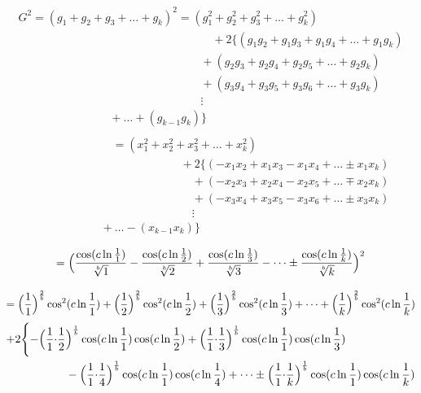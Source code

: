 \documentclass{amsart}
\begin{document}
	\[ \begin{array}{c}
		G^2 = (g_1 + g_2 + g_3 + \dots + g_k)^2 = (g_1^2 + g_2^2 + g_3^2 + \dots + g_k^2) \\
		\qquad\qquad\qquad\qquad\qquad\qquad\qquad\qquad\quad + 2\{(g_1g_2 + g_1g_3 + g_1g_4 + \dots + g_{1}g_{k}) \\ 
		\qquad\qquad\qquad\qquad\qquad\qquad\qquad\qquad + (g_2g_3 + g_2g_4 + g_2g_5 + \dots + g_2g_{k}) \\ 
		\qquad\qquad\qquad\qquad\qquad\qquad\qquad\qquad + (g_3g_4 + g_3g_5 + g_3g_6 + \dots + g_3g_{k}) \\ 
		\qquad\qquad\qquad\qquad\qquad\qquad\qquad\qquad \vdots \\
		\qquad\qquad\qquad\qquad + \dots + (g_{k-1}g_{k}) \} \\ 
	\end{array} \]
	\[ \begin{array}{c}
		\qquad\qquad\qquad\quad = (x_1^2 + x_2^2 + x_3^2 + \dots + x_k^2) \\ 
		\qquad\qquad\qquad\qquad\qquad\qquad\quad + 2\{(-x_1x_2 + x_1x_3 - x_1x_4 + \dots \pm x_{1}x_{k}) \\ 
		\qquad\qquad\qquad\qquad\qquad\qquad\qquad + (-x_2x_3 + x_2x_4 - x_2x_5 + \dots \mp x_{2}x_{k}) \\ 
		\qquad\qquad\qquad\qquad\qquad\qquad\qquad + (-x_3x_4 + x_3x_5 - x_3x_6 + \dots \pm x_{3}x_{k}) \\ 
		\qquad\qquad\qquad\qquad\qquad\qquad\qquad \vdots \\
		\qquad\qquad\qquad + \dots - (x_{k-1}x_{k}) \} \\ 
	\end{array} \]
	\[\]
	\[\]
	\[ = \Bigl( \frac{\cos({c\ln \frac{1}{1}})}{\sqrt[b]{1}} - \frac{\cos({c\ln \frac{1}{2}})}{\sqrt[b]{2}} + \frac{\cos({c\ln \frac{1}{3}})}{\sqrt[b]{3}} - \dots \pm \frac{\cos({c\ln \frac{1}{k}})}{\sqrt[b]{k}} \Bigr)^2 \]
	\[\]
	\[\]
	\[ = \Bigl( \frac{1}{1} \Bigr)^{\frac2b}\cos^2({c \ln \frac{1}{1}}) + \Bigl( \frac{1}{2} \Bigr)^{\frac2b}\cos^2({c \ln \frac{1}{2}}) + \Bigl( \frac{1}{3} \Bigr)^{\frac2b}\cos^2({c \ln \frac{1}{3}}) + \dots + \Bigl( \frac{1}{k} \Bigr)^{\frac2b}\cos^2({c \ln \frac{1}{k}}) \]
	\[
	\begin{aligned}
		+2\Biggl\{ -\Bigl( \frac{1}{1} {\cdot} \frac{1}{2}& \Bigr)^\frac1b \cos(c \ln \frac{1}{1}) \cos(c \ln \frac{1}{2}) + \Bigl( \frac{1}{1} {\cdot} \frac{1}{3} \Bigr)^\frac1b \cos(c \ln \frac{1}{1}) \cos(c \ln \frac{1}{3}) \\ 
		& - \Bigl( \frac{1}{1} {\cdot} \frac{1}{4} \Bigr)^\frac1b \cos(c \ln \frac{1}{1}) \cos(c \ln \frac{1}{4}) + \dots \pm \Bigl( \frac{1}{1} {\cdot} \frac{1}{k} \Bigr)^\frac1b \cos(c \ln \frac{1}{1}) \cos(c \ln \frac{1}{k}) \\ 		
	\end{aligned}
	\]
\end{document}

